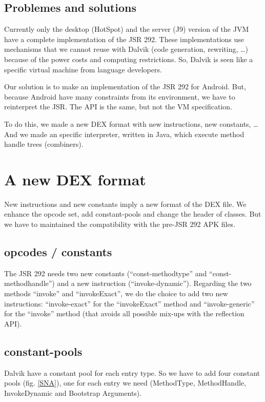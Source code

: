 \documentclass{sigplanconf}
\def \Jsr{JSR\xspace}
\def \JSR{\Jsr 292\xspace}
\begin{document}
  \subsection{Problemes and solutions}

    Currently only the desktop (HotSpot) and the server (J9) version of the JVM have a complete implementation of the JSR 292.
    These implementations use mechanisms that we cannot reuse with Dalvik (code generation, rewriting, \dots)
    because of the power costs and computing restrictions.
    So, Dalvik is seen like a specific virtual machine from language developers.
    
    Our solution is to make an implementation of the JSR 292 for Android.
    But, because Android have many constraints from its environment,
    we have to reinterpret the JSR.
    The API is the same, but not the VM specification.
    
    To do this, we made a new DEX format with new instructions, new constants, \dots
    And we made an specific interpreter, written in Java, which execute method handle trees (combiners).

\section{A new DEX format}

  New instructions and new constants imply a new format of the DEX file.
  We enhance the opcode set, add constant-pools and change the header of classes.
  But we have to maintained the compatibility with the pre-JSR 292 APK files.

  \subsection{opcodes / constants}
    The \JSR needs two new constants (``const-methodtype'' and ``const-methodhandle'') and a new instruction (``invoke-dynamic'').
    Regarding the two methods ``invoke'' and ``invokeExact'', we do the choice to add two new instructions:
    ``invoke-exact'' for the ``invokeExact'' method and ``invoke-generic'' for the ``invoke'' method (that avoids all possible mix-ups with the reflection API).

  \subsection{constant-pools}

    Dalvik have a constant pool for each entry type.
    So we have to add four constant pools (fig. \ref{SNA}), one for each entry we need
    (MethodType, MethodHandle, InvokeDynamic and Bootstrap Arguments).
\end{document}
